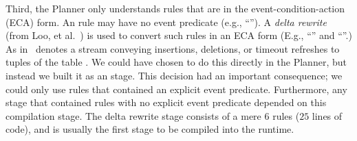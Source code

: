 

Third, the Planner only understands rules that are in the
event-condition-action (ECA) form. An \OVERLOG rule may have no event
predicate (e.g., ``'').  A {\em delta rewrite}
(from Loo, et al.~\cite{loo-sigmod06}) is used to convert such rules in an ECA
form (E.g., ``'' and ``''.) As in~\cite{loo-sigmod06}  denotes
a stream conveying insertions, deletions, or timeout refreshes to tuples of the
table .  We could have chosen to do this directly in the Planner, but
instead we built it as an \OVERLOG stage.  This decision had an
important consequence; we could only use rules that contained an explicit event
predicate.  Furthermore, any \OVERLOG stage that contained rules with no
explicit event predicate depended on this compilation stage.  The delta rewrite
\OVERLOG stage consists of a mere $6$ rules ($25$ lines of code), and is
usually the first \OVERLOG stage to be compiled into the runtime.
 

